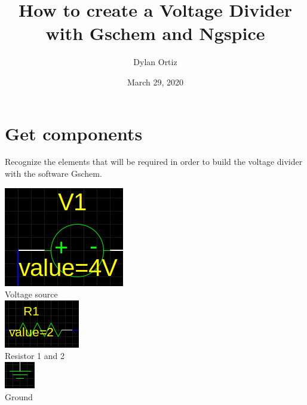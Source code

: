 \documentclass{article}
\title{How to create a Voltage Divider with Gschem and Ngspice}
\author{Dylan Ortiz }
\date{March 29, 2020}
\begin{document}
\maketitle

\section{Get components}
Recognize the elements that will be required in order to build the voltage divider with the software Gschem.
\begin{center}
    \includegraphics[width=.3\textwidth]{Vol.png}\\
    Voltage source\\
    
    \includegraphics[width=.3\textwidth]{Res.png}\\
    Resistor 1 and 2\\
    
    \includegraphics[width=.3\textwidth]{GRND.png}\\
    Ground\\
\end{center}
\end{document}
